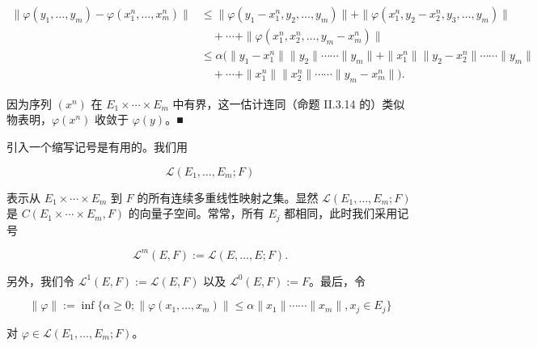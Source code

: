 \begin{proposition}
\begin{subitems}
\begin{equation*}
\begin{aligned}
\|\varphi(y_1, \ldots, y_m) - \varphi(x_1^n, \ldots, x_m^n)\| &\le \|\varphi(y_1 - x_1^n, y_2, \ldots, y_m)\| + \|\varphi(x_1^n, y_2 - x_2^n, y_3, \ldots, y_m)\| \\ &\quad + \cdots + \|\varphi(x_1^n, x_2^n, \ldots, y_m - x_m^n)\| \\ &\le \alpha\Big( \|y_1 - x_1^n\|\|y_2\| \cdots\cdots \|y_m\| + \|x_1^n\|\|y_2 - x_2^n\| \cdots\cdots \|y_m\| \\ &\quad + \cdots + \|x_1^n\|\|x_2^n\| \cdots\cdots \|y_m - x_m^n\| \Big) .
\end{aligned}
\end{equation*}

因为序列 $ (x^n) $ 在 $ E_1 \times \cdots \times E_m $ 中有界，这一估计连同（命题 II.3.14 的）类似物表明，$ \varphi(x^n) $ 收敛于 $ \varphi(y) $。\nobreak\hspace{0.35em}■

\end{subitems}

\end{proposition}

引入一个缩写记号是有用的。我们用

\[
\mathcal{L}(E_1, \ldots, E_m; F)
\]

表示从 $ E_1 \times \cdots \times E_m $ 到 $ F $ 的所有连续多重线性映射之集。显然 $ \mathcal{L}(E_1, \ldots, E_m; F) $ 是 $ C(E_1 \times \cdots \times E_m, F) $ 的向量子空间。常常，所有 $ E_j $ 都相同，此时我们采用记号

\[
\mathcal{L}^m(E, F) := \mathcal{L}(E, \ldots, E; F) .
\]

另外，我们令 $ \mathcal{L}^1(E, F) := \mathcal{L}(E, F) $ 以及 $ \mathcal{L}^0(E, F) := F $。最后，令

\begin{equation}
\|\varphi\| := \inf\{ \alpha \ge 0 ; \|\varphi(x_1, \ldots, x_m)\| \le \alpha\|x_1\| \cdots\cdots \|x_m\|, x_j \in E_j \}\tag{4.1}
\end{equation}

对 $ \varphi \in \mathcal{L}(E_1, \ldots, E_m; F) $。

